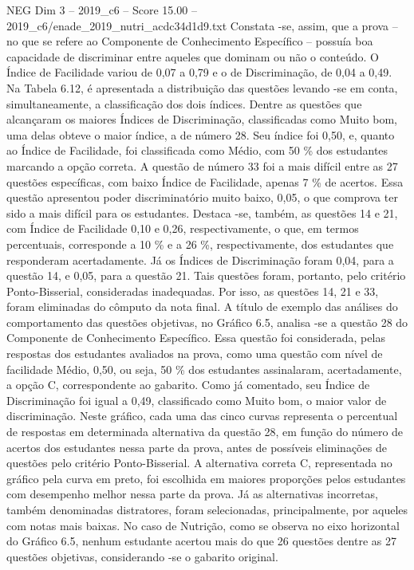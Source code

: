 \begin{textsample}{NEG Dim 3 – 2019\_c6 – Score 15.00 – 2019\_c6/enade\_2019\_nutri\_acdc34d1d9.txt}
Constata -se, assim, que a prova – no que se refere ao Componente de Conhecimento Específico – possuía boa capacidade de discriminar entre aqueles que dominam ou não o conteúdo.
O Índice de Facilidade variou de 0,07 a 0,79 e o de Discriminação, de 0,04 a 0,49.
Na Tabela 6.12, é apresentada a distribuição das questões levando -se em conta, simultaneamente, a classificação dos dois índices.
Dentre as questões que alcançaram os maiores Índices de Discriminação, classificadas como Muito bom, uma delas obteve o maior índice, a de número 28.
Seu índice foi 0,50, e, quanto ao Índice de Facilidade, foi classificada como Médio, com 50 \% dos estudantes marcando a opção correta.
A questão de número 33 foi a mais difícil entre as 27 questões específicas, com baixo Índice de Facilidade, apenas 7 \% de acertos.
Essa questão apresentou poder discriminatório muito baixo, 0,05, o que comprova ter sido a mais difícil para os estudantes.
Destaca -se, também, as questões 14 e 21, com Índice de Facilidade 0,10 e 0,26, respectivamente, o que, em termos percentuais, corresponde a 10 \% e a 26 \%, respectivamente, dos estudantes que responderam acertadamente.
Já os Índices de Discriminação foram 0,04, para a questão 14, e 0,05, para a questão 21.
Tais questões foram, portanto, pelo critério Ponto-Bisserial, consideradas inadequadas.
Por isso, as questões 14, 21 e 33, foram eliminadas do cômputo da nota final.
A título de exemplo das análises do comportamento das questões objetivas, no Gráfico 6.5, analisa -se a questão 28 do Componente de Conhecimento Específico.
Essa questão foi considerada, pelas respostas dos estudantes avaliados na prova, como uma questão com nível de facilidade Médio, 0,50, ou seja, 50 \% dos estudantes assinalaram, acertadamente, a opção C, correspondente ao gabarito.
Como já comentado, seu Índice de Discriminação foi igual a 0,49, classificado como Muito bom, o maior valor de discriminação.
Neste gráfico, cada uma das cinco curvas representa o percentual de respostas em determinada alternativa da questão 28, em função do número de acertos dos estudantes nessa parte da prova, antes de possíveis eliminações de questões pelo critério Ponto-Bisserial.
A alternativa correta C, representada no gráfico pela curva em preto, foi escolhida em maiores proporções pelos estudantes com desempenho melhor nessa parte da prova.
Já as alternativas incorretas, também denominadas distratores, foram selecionadas, principalmente, por aqueles com notas mais baixas.
No caso de Nutrição, como se observa no eixo horizontal do Gráfico 6.5, nenhum estudante acertou mais do que 26 questões dentre as 27 questões objetivas, considerando -se o gabarito original.

\end{textsample}
